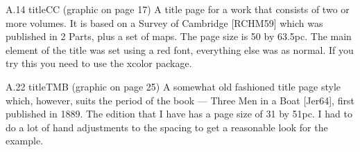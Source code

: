A.14 titleCC (graphic on page 17)
A title page for a work that consists of two or more volumes. It is based on a Survey
of Cambridge [RCHM59] which was published in 2 Parts, plus a set of maps. The page
size is 50 by 63.5pc. The main element of the title was set using a red font, everything
else was as normal. If you try this you need to use the xcolor package.
\newcommand*{\titleCC}{\begingroup%
\drop=0.1\textheight
\vspace*{\drop}
\centering
{\Large\itshape THE BIG BOOK OF}\\[0.5\drop]
{\textcolor{Red}{\HUGE\bfseries CONUNDRUMS}}\par
\vspace{\drop}
{\LARGE\itshape VOLUME 1: SOCIAL AND MORAL}\par
\vfill
{\Large THE AUTHOR}\par
\vfill
{\plogo}\\[0.5\baselineskip]
54
{\itshape THE PUBLISHER}\par
{\scshape year}\par
\vspace*{\drop}
\endgroup}

A.22 titleTMB (graphic on page 25)
A somewhat old fashioned title page style which, however, suits the period of the book
— Three Men in a Boat [Jer64], first published in 1889. The edition that I have has a
page size of 31 by 51pc.
I had to do a lot of hand adjustments to the spacing to get a reasonable look for the
example.
\newcommand*{\titleTMB}{\begingroup%
\drop=0.1\textheight
\centering
\settowidth{\unitlength}{\LARGE THE BOOK OF CONUNDRUMS}
\vspace*{\baselineskip}
{\large\scshape the author}\\[\baselineskip]
\rule{\unitlength}{1.6pt}\vspace*{-\baselineskip}\vspace*{2pt}
\rule{\unitlength}{0.4pt}\\[\baselineskip]
{\LARGE THE BOOK OF CONUNDRUMS}\\[\baselineskip]
59
{\itshape puzzles for the mind}\\[0.2\baselineskip]
\rule{\unitlength}{0.4pt}\vspace*{-\baselineskip}\vspace{3.2pt}
\rule{\unitlength}{1.6pt}\\[\baselineskip]
{\large\scshape drawings by the artist}\par
\vfill
{\large\scshape the publisher}\\[\baselineskip]
{\small\scshape year}\par
\vspace*{\drop}
\endgroup}

